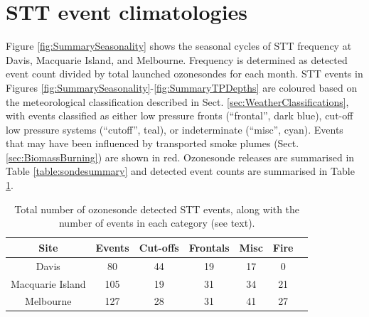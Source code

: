 \documentclass[acp, manuscript]{copernicus} %
\begin{document}
\section{STT event climatologies}
  \label{sec:eventclimatologies}
  Figure \ref{fig:SummarySeasonality} shows the seasonal cycles of STT frequency at Davis, Macquarie Island, and Melbourne.
  Frequency is determined as detected event count divided by total launched ozonesondes for each month.
  STT events in Figures \ref{fig:SummarySeasonality}-\ref{fig:SummaryTPDepths} are coloured based on the meteorological classification described in Sect. \ref{sec:WeatherClassifications}, with events classified as either low pressure fronts (“frontal”, dark blue), cut-off low pressure systems (“cutoff”, teal), or indeterminate (“misc”, cyan).
  Events that may have been influenced by transported smoke plumes (Sect. \ref{sec:BiomassBurning}) are shown in red.
  Ozonesonde releases are summarised in Table \ref{table:sondesummary} and detected event counts are summarised in Table \ref{table:EventCounts}.
  \begin{table}[t]
    \caption{Total number of ozonesonde detected STT events, along with the number of events in each category (see text).}
    \begin{tabular}{ c   c   c   c   c   c   c } 
      \hline
      Site & Events & Cut-offs & Frontals & Misc & Fire \\
      \hline
      Davis       	& 80 & 44  & 19 & 17 & 0 \\ 
      Macquarie Island 	& 105 & 19 & 31 & 34  & 21 \\
      Melbourne 	& 127 & 28 & 31 & 41 & 27 \\
      \hline
    \end{tabular}
    \label{table:EventCounts}
  \end{table}
  
\end{document}
